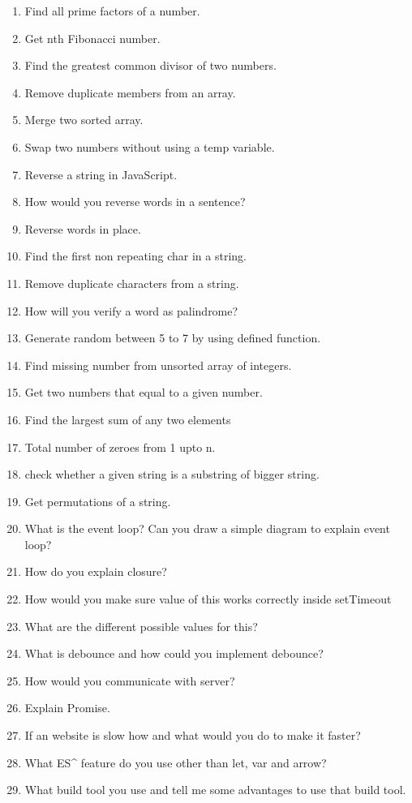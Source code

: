 \documentclass[11pt]{article}
\begin{document}
\begin{enumerate}
\item Find all prime factors of a number.
\item Get nth Fibonacci number.
\item Find the greatest common divisor of two numbers.
\item Remove duplicate members from an array.
\item Merge two sorted array.
\item Swap two numbers without using a temp variable.
\item Reverse a string in JavaScript.
\item How would you reverse words in a sentence?
\item Reverse words in place.
\item Find the first non repeating char in a string.
\item Remove duplicate characters from a string.
\item How will you verify a word as palindrome?
\item Generate random between 5 to 7 by using defined function.
\item Find missing number from unsorted array of integers.
\item Get two numbers that equal to a given number.
\item Find the largest sum of any two elements
\item Total number of zeroes from 1 upto n.
\item check whether a given string is a substring of bigger string.
\item Get permutations of a string.
\item What is the event loop? Can you draw a simple diagram to explain event loop?
\item How do you explain closure?
\item How would you make sure value of this works correctly inside setTimeout
\item What are the different possible values for this?
\item What is debounce and how could you implement debounce?
\item How would you communicate with server?
\item Explain Promise.
\item If an website is slow how and what would you do to make it faster?
\item What ES\^{} feature do you use other than let, var and arrow?
\item What build tool you use and tell me some advantages to use that build tool.
\end{enumerate}
\end{document}
